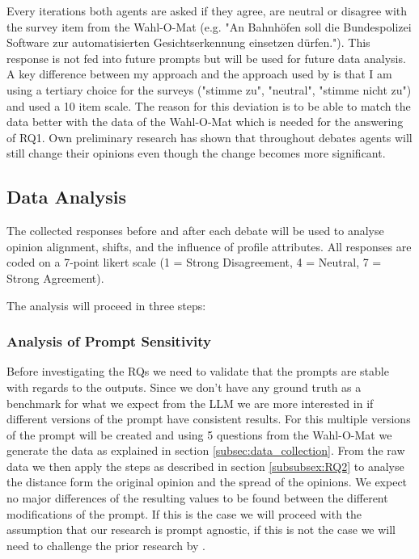 \documentclass[12pt]{article}
\begin{document}
\begin{multicols}{2}
Every iterations both agents are asked if they agree, are neutral or disagree with the survey item from the Wahl-O-Mat (e.g. "An Bahnhöfen soll die Bundespolizei Software zur automatisierten Gesichtserkennung einsetzen dürfen."). This response is not fed into future prompts but will be used for future data analysis. A key difference between my approach and the approach used by  is that I am using a tertiary choice for the surveys ("stimme zu", "neutral", "stimme nicht zu") and  used a 10 item scale. The reason for this deviation is to be able to match the data better with the data of the Wahl-O-Mat which is needed for the answering of RQ1. Own preliminary research has shown that throughout debates agents will still change their opinions even though the change becomes more significant.  

\subsection{Data Analysis}

The collected responses before and after each debate will be used to analyse opinion alignment, shifts, and the influence of profile attributes. All responses are coded on a 7-point likert scale (1 = Strong Disagreement, 4 = Neutral, 7 = Strong Agreement).

The analysis will proceed in three steps:


\subsubsection{Analysis of Prompt Sensitivity}

Before investigating the RQs we need to validate that the prompts are stable with regards to the outputs. Since we don't have any ground truth as a benchmark for what we expect from the LLM we are more interested in if different versions of the prompt have consistent results. For this multiple versions of the prompt will be created and using 5 questions from the Wahl-O-Mat we generate the data as explained in section \ref{subsec:data_collection}. From the raw data we then apply the steps as described in section \ref{subsubsex:RQ2} to analyse the distance form the original opinion and the spread of the opinions. We expect no major differences of the resulting values to be found between the different modifications of the prompt. If this is the case we will proceed with the assumption that our research is prompt agnostic, if this is not the case we will need to challenge the prior research by . 



\end{multicols}
\end{document}
